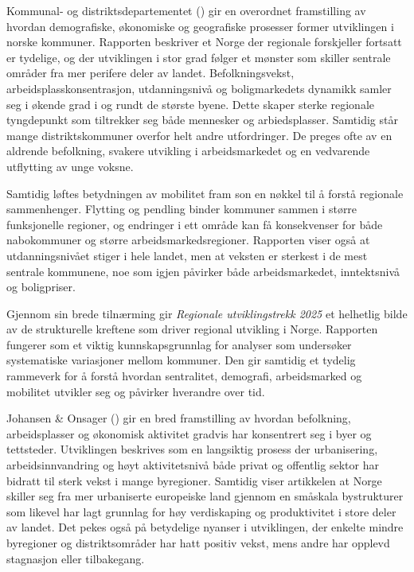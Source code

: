 \documentclass[
  norsk,
  letterpaper,
  DIV=11,
  numbers=noendperiod]{scrartcl}
\begin{document}
Kommunal- og distriktsdepartementet
() gir en overordnet
framstilling av hvordan demografiske, økonomiske og geografiske
prosesser former utviklingen i norske kommuner. Rapporten beskriver et
Norge der regionale forskjeller fortsatt er tydelige, og der utviklingen
i stor grad følger et mønster som skiller sentrale områder fra mer
perifere deler av landet. Befolkningsvekst, arbeidsplasskonsentrasjon,
utdanningsnivå og boligmarkedets dynamikk samler seg i økende grad i og
rundt de største byene. Dette skaper sterke regionale tyngdepunkt som
tiltrekker seg både mennesker og arbiedsplasser. Samtidig står mange
distriktskommuner overfor helt andre utfordringer. De preges ofte av en
aldrende befolkning, svakere utvikling i arbeidsmarkedet og en
vedvarende utflytting av unge voksne.

Samtidig løftes betydningen av mobilitet fram son en nøkkel til å forstå
regionale sammenhenger. Flytting og pendling binder kommuner sammen i
større funksjonelle regioner, og endringer i ett område kan få
konsekvenser for både nabokommuner og større arbeidsmarkedsregioner.
Rapporten viser også at utdanningsnivået stiger i hele landet, men at
veksten er sterkest i de mest sentrale kommunene, noe som igjen påvirker
både arbeidsmarkedet, inntektsnivå og boligpriser.

Gjennom sin brede tilnærming gir \emph{Regionale utviklingstrekk 2025}
et helhetlig bilde av de strukturelle kreftene som driver regional
utvikling i Norge. Rapporten fungerer som et viktig kunnskapsgrunnlag
for analyser som undersøker systematiske variasjoner mellom kommuner.
Den gir samtidig et tydelig rammeverk for å forstå hvordan sentralitet,
demografi, arbeidsmarked og mobilitet utvikler seg og påvirker hverandre
over tid.

Johansen \& Onsager () gir en
bred framstilling av hvordan befolkning, arbeidsplasser og økonomisk
aktivitet gradvis har konsentrert seg i byer og tettsteder. Utviklingen
beskrives som en langsiktig prosess der urbanisering, arbeidsinnvandring
og høyt aktivitetsnivå både privat og offentlig sektor har bidratt til
sterk vekst i mange byregioner. Samtidig viser artikkelen at Norge
skiller seg fra mer urbaniserte europeiske land gjennom en småskala
bystrukturer som likevel har lagt grunnlag for høy verdiskaping og
produktivitet i store deler av landet. Det pekes også på betydelige
nyanser i utviklingen, der enkelte mindre byregioner og distriktsområder
har hatt positiv vekst, mens andre har opplevd stagnasjon eller
tilbakegang.
\end{document}
